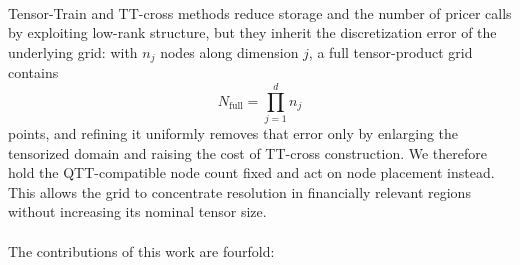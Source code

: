 \documentclass{article}
\numberwithin{equation}{subsection}
\theoremstyle{definition}
\theoremstyle{remark}
\begin{document}
\\Tensor-Train and TT-cross methods reduce storage and the number of pricer
calls by exploiting low-rank structure, but they inherit the discretization
error of the underlying grid: with $n_j$ nodes along dimension $j$, a full
tensor-product grid contains
\[
N_{\mathrm{full}}=\prod_{j=1}^{d} n_j
\]
points, and refining it uniformly removes that error only by enlarging the
tensorized domain and raising the cost of TT-cross construction. We therefore
hold the QTT-compatible node count fixed and act on node placement instead. This allows the grid to concentrate resolution in financially relevant regions without increasing its nominal
tensor size.\\
\\
The contributions of this work are fourfold:
\end{document}
